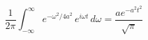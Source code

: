 $$
\frac{1}{2\pi}\int_{-\infty}^{\infty} e^{-\omega^2/4a^2}\,e^{i\omega t}\,d\omega = \frac{a e^{- a^{2} t^{2}}}{\sqrt{\pi}}
\label{eq:pulse}
$$
